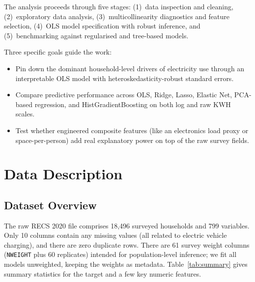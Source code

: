 \documentclass[10pt,twocolumn]{article}
\begin{document}
The analysis proceeds through five stages: (1)~data inspection and cleaning, (2)~exploratory data analysis, (3)~multicollinearity diagnostics and feature selection, (4)~OLS model specification with robust inference, and (5)~benchmarking against regularised and tree-based models.

Three specific goals guide the work:

\begin{itemize}
\item Pin down the dominant household-level drivers of electricity use through an interpretable OLS model with heteroskedasticity-robust standard errors.
\item Compare predictive performance across OLS, Ridge, Lasso, Elastic Net, PCA-based regression, and HistGradientBoosting on both log and raw KWH scales.
\item Test whether engineered composite features (like an electronics load proxy or space-per-person) add real explanatory power on top of the raw survey fields.
\end{itemize}

\section{Data Description}

\subsection{Dataset Overview}

The raw RECS 2020 file comprises 18{,}496 surveyed households and 799 variables. Only 10 columns contain any missing values (all related to electric vehicle charging), and there are zero duplicate rows. There are 61 survey weight columns (\texttt{NWEIGHT} plus 60 replicates) intended for population-level inference; we fit all models unweighted, keeping the weights as metadata. Table~\ref{tab:summary} gives summary statistics for the target and a few key numeric features.
\end{document}
